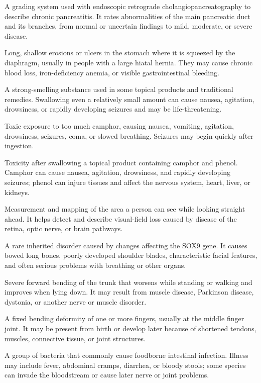  A grading system used with endoscopic retrograde cholangiopancreatography to describe chronic pancreatitis. It rates abnormalities of the main pancreatic duct and its branches, from normal or uncertain findings to mild, moderate, or severe disease.

 Long, shallow erosions or ulcers in the stomach where it is squeezed by the diaphragm, usually in people with a large hiatal hernia. They may cause chronic blood loss, iron-deficiency anemia, or visible gastrointestinal bleeding.

 A strong-smelling substance used in some topical products and traditional remedies. Swallowing even a relatively small amount can cause nausea, agitation, drowsiness, or rapidly developing seizures and may be life-threatening.

 Toxic exposure to too much camphor, causing nausea, vomiting, agitation, drowsiness, seizures, coma, or slowed breathing. Seizures may begin quickly after ingestion.

 Toxicity after swallowing a topical product containing camphor and phenol. Camphor can cause nausea, agitation, drowsiness, and rapidly developing seizures; phenol can injure tissues and affect the nervous system, heart, liver, or kidneys.

 Measurement and mapping of the area a person can see while looking straight ahead. It helps detect and describe visual-field loss caused by disease of the retina, optic nerve, or brain pathways.

 A rare inherited disorder caused by changes affecting the SOX9 gene. It causes bowed long bones, poorly developed shoulder blades, characteristic facial features, and often serious problems with breathing or other organs.

 Severe forward bending of the trunk that worsens while standing or walking and improves when lying down. It may result from muscle disease, Parkinson disease, dystonia, or another nerve or muscle disorder.

 A fixed bending deformity of one or more fingers, usually at the middle finger joint. It may be present from birth or develop later because of shortened tendons, muscles, connective tissue, or joint structures.

 A group of bacteria that commonly cause foodborne intestinal infection. Illness may include fever, abdominal cramps, diarrhea, or bloody stools; some species can invade the bloodstream or cause later nerve or joint problems.

